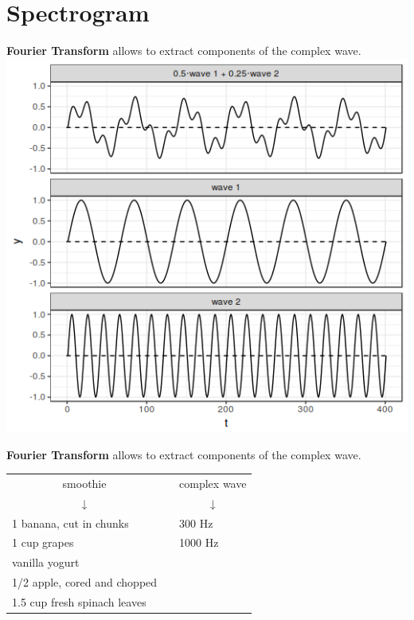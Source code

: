 \section{Spectrogram}
\begin{frame}
\textbf{Fourier Transform} allows to extract components of the complex wave. \vfill
\includegraphics[width=0.8\linewidth]{16-complex.png}
\end{frame}

\begin{frame}
\textbf{Fourier Transform} allows to extract components of the complex wave. \vfill
\begin{tabular}{lll}

\multicolumn{1}{c}{smoothie} &  & \multicolumn{1}{c}{complex wave} \\ 
\multicolumn{1}{c}{↓} & \multicolumn{1}{c}{} & \multicolumn{1}{c}{↓} \\ 
1 banana, cut in chunks &  & 300 Hz \\ 

1 cup grapes  &  & 1000 Hz \\ 
vanilla yogurt &  & \\ 
1/2 apple, cored and chopped &  &  \\ 
1.5 cup fresh spinach leaves  &  &  \\ 
\end{tabular}
\end{frame}

